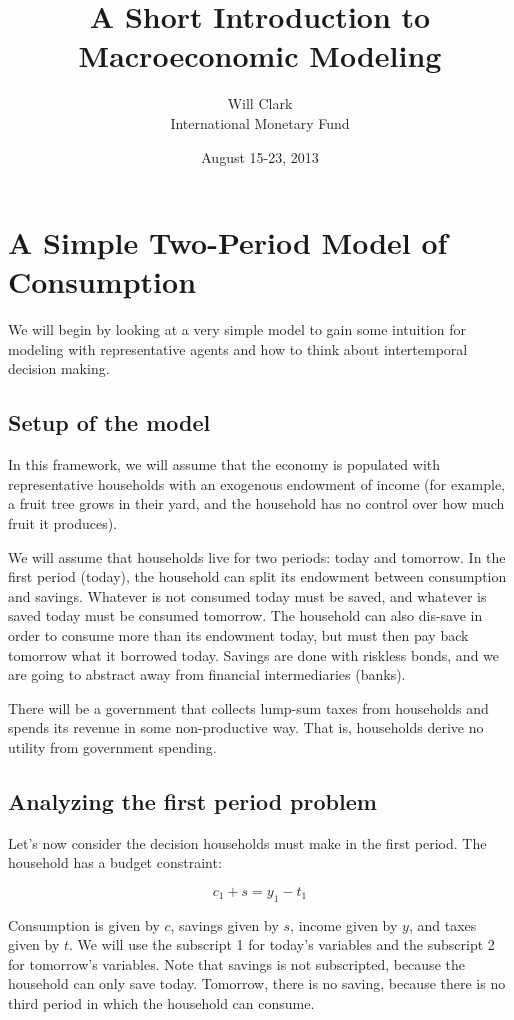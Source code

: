 \documentclass[12pt]{article}
\title{A Short Introduction to Macroeconomic Modeling}
\author{Will Clark\\
	International Monetary Fund}
\date{August 15-23, 2013}
\begin{document}
\maketitle

\tableofcontents

\section{A Simple Two-Period Model of Consumption}

We will begin by looking at a very simple model to gain some intuition for modeling with representative agents and how to think about intertemporal decision making.

\subsection{Setup of the model}

In this framework, we will assume that the economy is populated with representative households with an exogenous endowment of income (for example, a fruit tree grows in their yard, and the household has no control over how much fruit it produces). 

We will assume that households live for two periods: today and tomorrow. In the first period (today), the household can split its endowment between consumption and savings. Whatever is not consumed today must be saved, and whatever is saved today must be consumed tomorrow. The household can also dis-save in order to consume more than its endowment today, but must then pay back tomorrow what it borrowed today. Savings are done with riskless bonds, and we are going to abstract away from financial intermediaries (banks). 

There will be a government that collects lump-sum taxes from households and spends its revenue in some non-productive way. That is, households derive no utility from government spending.

\subsection{Analyzing the first period problem}

Let's now consider the decision households must make in the first period. The household has a budget constraint:

\[ c_1 + s = y_1 - t_1 \]

Consumption is given by \(c\), savings given by \(s\), income given by \(y\), and taxes given by \(t\). We will use the subscript 1 for today's variables and the subscript 2 for tomorrow's variables. Note that savings is not subscripted, because the household can only save today. Tomorrow, there is no saving, because there is no third period in which the household can consume.
\end{document}
